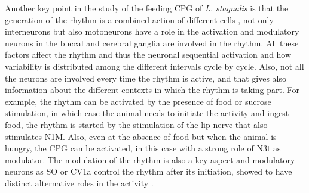 Another key point in the study of the feeding CPG of \textit{L. stagnalis} is that the generation of the rhythm is a combined action of different cells \parencite{benjamin_distributed_2012}, not only interneurons but also motoneurons have a role in the activation \parencite{staras_pattern-generating_1998} and modulatory neurons in the buccal and cerebral ganglia are involved in the rhythm. All these factors affect the rhythm and thus the neuronal sequential activation and how variability is distributed among the different intervals cycle by cycle. Also, not all the neurons are involved every time the rhythm is active, and that gives also information about the different contexts in which the rhythm is taking part. For example, the rhythm can be activated by the presence of food or sucrose stimulation, in which case the animal needs to initiate the activity and ingest food, the rhythm is started by the stimulation of the lip nerve that also stimulates N1M. Also, even at the absence of food but when the animal is hungry, the CPG can be activated, in this case with a strong role of N3t as modulator. The modulation of the rhythm is also a key aspect and modulatory neurons as SO or CV1a control the rhythm after its initiation, showed to have distinct alternative roles in the activity \parencite{kemenes_multiple_2001}. 

